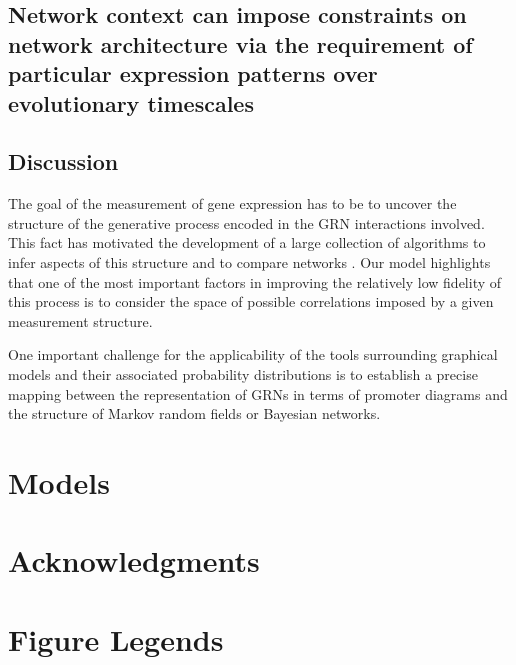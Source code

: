 \subsection*{Network context can impose constraints on network architecture via the requirement of particular expression patterns over evolutionary timescales}

\subsection*{Discussion}
The goal of the measurement of gene expression has to be to uncover the structure of the generative process encoded in the GRN interactions involved. This fact has motivated the development of a large collection of algorithms to infer aspects of this structure \cite{DeSmet2010} and to compare networks \cite{Ideker2012}. Our model highlights that one of the most important factors in improving the relatively low fidelity of this process is to consider the space of possible correlations imposed by a given measurement structure.

One important challenge for the applicability of the tools surrounding graphical models and their associated probability distributions is to establish a precise mapping between the representation of GRNs in terms of promoter diagrams and the structure of Markov random fields or Bayesian networks.

\section*{Models}



%

\section*{Acknowledgments}




\section*{Figure Legends}


